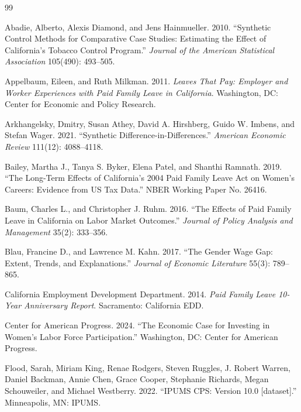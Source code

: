 \documentclass[12pt, letterpaper]{article}
\begin{document}
\newpage


\begin{thebibliography}{99}

Abadie, Alberto, Alexis Diamond, and Jens Hainmueller. 2010. ``Synthetic Control Methods for Comparative Case Studies: Estimating the Effect of California's Tobacco Control Program.'' \textit{Journal of the American Statistical Association} 105(490): 493--505.

Appelbaum, Eileen, and Ruth Milkman. 2011. \textit{Leaves That Pay: Employer and Worker Experiences with Paid Family Leave in California}. Washington, DC: Center for Economic and Policy Research.

Arkhangelsky, Dmitry, Susan Athey, David A. Hirshberg, Guido W. Imbens, and Stefan Wager. 2021. ``Synthetic Difference-in-Differences.'' \textit{American Economic Review} 111(12): 4088--4118.

Bailey, Martha J., Tanya S. Byker, Elena Patel, and Shanthi Ramnath. 2019. ``The Long-Term Effects of California's 2004 Paid Family Leave Act on Women's Careers: Evidence from US Tax Data.'' NBER Working Paper No. 26416.

Baum, Charles L., and Christopher J. Ruhm. 2016. ``The Effects of Paid Family Leave in California on Labor Market Outcomes.'' \textit{Journal of Policy Analysis and Management} 35(2): 333--356.

Blau, Francine D., and Lawrence M. Kahn. 2017. ``The Gender Wage Gap: Extent, Trends, and Explanations.'' \textit{Journal of Economic Literature} 55(3): 789--865.

California Employment Development Department. 2014. \textit{Paid Family Leave 10-Year Anniversary Report}. Sacramento: California EDD.

Center for American Progress. 2024. ``The Economic Case for Investing in Women's Labor Force Participation.'' Washington, DC: Center for American Progress.

Flood, Sarah, Miriam King, Renae Rodgers, Steven Ruggles, J. Robert Warren, Daniel Backman, Annie Chen, Grace Cooper, Stephanie Richards, Megan Schouweiler, and Michael Westberry. 2022. ``IPUMS CPS: Version 10.0 [dataset].'' Minneapolis, MN: IPUMS.


\end{thebibliography}
\end{document}
